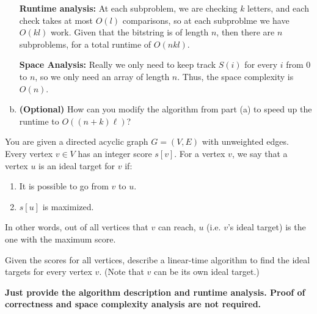 \documentclass[11pt]{article}
\begin{document}
\begin{enumerate}[(a)]
\begin{solution}
		\textbf{Runtime analysis:} At each subproblem, we are checking $k$ letters, and each 
		check takes at most $O(l)$ comparisons, so at each subproblme we have $O(kl)$ work. Given 
		that the bitstring is of length $n$, then there are $n$ subproblems, for a total runtime of $O(nkl)$.

		 \textbf{Space Analysis:} Really we only need to keep track $S(i)$ for every $i$ from 0 to $n$, 
		 so we only need an array of length $n$. Thus, the space complexity is $O(n)$. 
	\end{solution}


    \item \textbf{(Optional)} How can you modify the algorithm from part (a) to speed up the runtime to $O((n + k)\ell)$?

\end{enumerate}

\newpage


You are given a directed acyclic graph $G = (V, E)$ with unweighted edges. Every vertex $v \in V$ has an integer score $s[v]$. For a vertex $v$, we say that a vertex $u$ is an ideal target for $v$ if:

\begin{enumerate}
  \item It is possible to go from $v$ to $u$.
  \item $s[u]$ is maximized.
\end{enumerate}

In other words, out of all vertices that $v$ can reach, $u$ (i.e. $v$'s ideal target) is the one with the maximum score.

Given the scores for all vertices, describe a linear-time algorithm to find the ideal targets for every vertex $v$.
(Note that $v$ can be its own ideal target.) 

\textbf{Just provide the algorithm description and runtime analysis. Proof of correctness and space complexity analysis are not required.}
\end{document}
